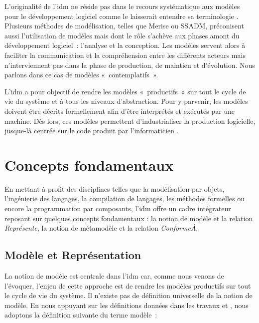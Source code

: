 L'originalité de l'\gls{idm} ne réside pas dans le recours systématique aux modèles 
pour le développement logiciel comme le laisserait entendre sa terminologie  
\cite{bezivin2004rapport}. Plusieurs méthodes de modélisation, telles que Merise 
ou SSADM, préconisent aussi l'utilisation de modèles mais dont le rôle s'achève aux 
phases amont du développement logiciel~: l'analyse et la conception. Les modèles 
servent alors à faciliter la communication et la compréhension entre les différents 
acteurs mais n'interviennent pas dans la phase de production, de maintien et 
d'évolution. Nous parlons dans ce cas de modèles «~contemplatifs~». 

L'\gls{idm} a pour objectif de rendre les modèles «~productifs~» sur tout le cycle de 
vie du système et à tous les niveaux d'abstraction. Pour y parvenir, les modèles 
doivent être décrits formellement afin d'être interprétés et exécutés par une 
machine. Dès lors, ces modèles permettent d'industrialiser la production 
logicielle, jusque-là centrée sur le code produit par l'informaticien 
\cite{bezivin2005unification}.



\section{Concepts fondamentaux}
\label{sec:concepts_idm}

En mettant à profit des disciplines telles que la modélisation par objets, 
l'ingénierie des langages, la compilation de langages, les méthodes formelles 
ou encore la programmation par composants, l'\gls{idm} offre un cadre intégrateur reposant 
sur quelques concepts fondamentaux : la notion de modèle et la relation 
\textit{Représente}, la notion de métamodèle et la relation 
\textit{ConformeÀ}.

\subsection{Modèle et Représentation}
La notion de modèle est centrale dans l'\gls{idm} car, comme nous venons de l'évoquer, 
l'enjeu de cette approche est de rendre les modèles productifs sur tout le cycle 
de vie du système. Il n'existe pas de définition universelle de la notion de 
modèle. En nous appuyant sur les définitions données dans les travaux 
\cite{minsky1967computation} \cite{bezivin2001towards} et 
\cite{seidewitz2003models}, nous adoptons la définition suivante du terme modèle~:
\\\

